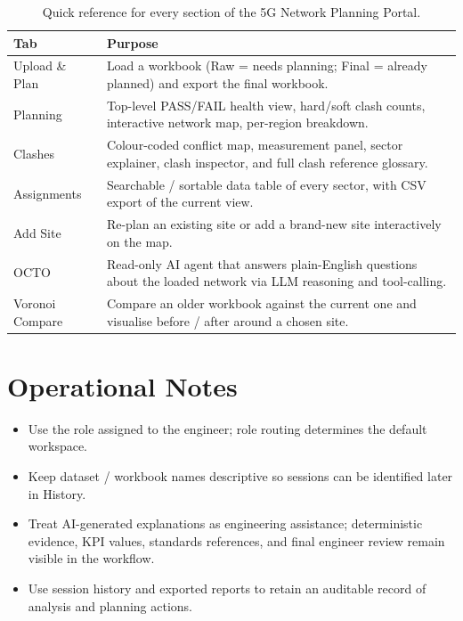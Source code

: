 \documentclass[11pt,a4paper]{article}
\begin{document}
\begin{table}[H]
\centering
\small
\begin{tabularx}{0.97\textwidth}{L{3.4cm} Y}
\toprule
\textbf{Tab} & \textbf{Purpose} \\
\midrule
Upload \& Plan     & Load a workbook (Raw = needs planning; Final = already planned) and export the final workbook. \\
Planning           & Top-level PASS/FAIL health view, hard/soft clash counts, interactive network map, per-region breakdown. \\
Clashes            & Colour-coded conflict map, measurement panel, sector explainer, clash inspector, and full clash reference glossary. \\
Assignments        & Searchable / sortable data table of every sector, with CSV export of the current view. \\
Add Site           & Re-plan an existing site or add a brand-new site interactively on the map. \\
OCTO               & Read-only AI agent that answers plain-English questions about the loaded network via LLM reasoning and tool-calling. \\
Voronoi Compare    & Compare an older workbook against the current one and visualise before / after around a chosen site. \\
\bottomrule
\end{tabularx}
\caption{Quick reference for every section of the 5G Network Planning Portal.}
\label{tab:np-quickref}
\end{table}

\section{Operational Notes}
\begin{itemize}
  \item Use the role assigned to the engineer; role routing determines the default workspace.
  \item Keep dataset / workbook names descriptive so sessions can be identified later in History.
  \item Treat AI-generated explanations as engineering assistance; deterministic evidence, KPI values, standards references, and final engineer review remain visible in the workflow.
  \item Use session history and exported reports to retain an auditable record of analysis and planning actions.
\end{itemize}
\end{document}
